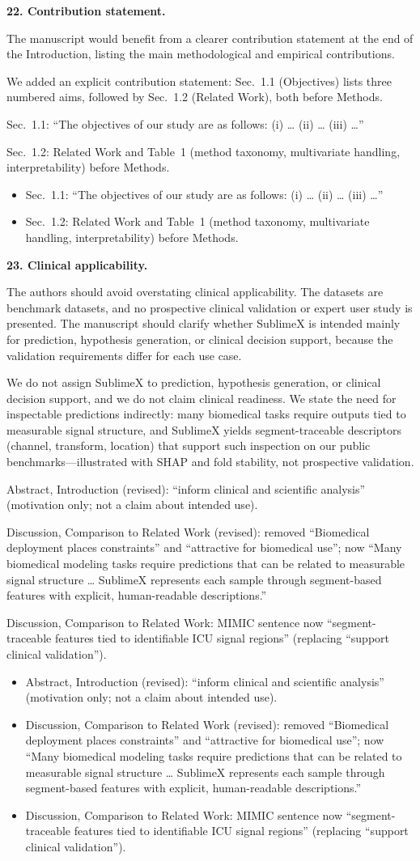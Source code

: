 \documentclass[11pt]{article}
\makeatletter
\newcommand{\rsp}{\par\vspace{0.9em}}
\newcommand{\rcitem}[2]{\begin{reviewerbox}\textbf{#1}\par\smallskip#2\end{reviewerbox}}
\newcommand{\response}[2]{%
  \begin{responsebox}#1%
  \def\@responseitems{#2}%
  \ifx\@responseitems\empty\else\begin{itemize}[nosep,leftmargin=1.2em]#2\end{itemize}\fi
  \end{responsebox}\rsp}
\makeatother
\begin{document}
\rcitem{22. Contribution statement.}{The manuscript would benefit from a clearer contribution
statement at the end of the Introduction, listing the main methodological and empirical
contributions.}

\response{We added an explicit contribution statement: Sec.~1.1 (Objectives) lists three numbered
aims, followed by Sec.~1.2 (Related Work), both before Methods.}{
  \item Sec.~1.1: ``The objectives of our study are as follows: (i) \ldots{} (ii) \ldots{}
    (iii) \ldots{}''
  \item Sec.~1.2: Related Work and Table~1 (method taxonomy, multivariate handling, interpretability)
    before Methods.
}

\rcitem{23. Clinical applicability.}{The authors should avoid overstating clinical applicability.
The datasets are benchmark datasets, and no prospective clinical validation or expert user study
is presented. The manuscript should clarify whether SublimeX is intended mainly for prediction,
hypothesis generation, or clinical decision support, because the validation requirements differ
for each use case.}

\response{We do not assign SublimeX to prediction, hypothesis generation, or clinical decision
support, and we do not claim clinical readiness. We state the need for inspectable predictions
indirectly: many biomedical tasks require outputs tied to measurable signal structure, and SublimeX
yields segment-traceable descriptors (channel, transform, location) that support such inspection on
our public benchmarks---illustrated with SHAP and fold stability, not prospective validation.}{
  \item Abstract, Introduction (revised): ``inform clinical and scientific analysis'' (motivation
    only; not a claim about intended use).
  \item Discussion, Comparison to Related Work (revised): removed ``Biomedical deployment places
    constraints'' and ``attractive for biomedical use''; now ``Many biomedical modeling tasks require
    predictions that can be related to measurable signal structure \ldots{} SublimeX represents each
    sample through segment-based features with explicit, human-readable descriptions.''
  \item Discussion, Comparison to Related Work: MIMIC sentence now ``segment-traceable features tied
    to identifiable ICU signal regions'' (replacing ``support clinical validation'').
}
\end{document}
